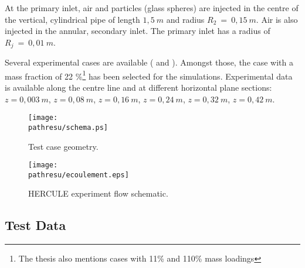 \documentclass[a4paper,twoside,12pt]{article}
\newlength{\largfigk}
\newcommand{\pathresu}{./FIGURES}
\begin{document}
\noindent
At the primary inlet, air and particles (glass spheres) are injected in the centre of the vertical, cylindrical pipe of length $1,5~m$ and radius $R_2~=~0,15~m$. Air is also injected in the annular, secondary inlet. The primary inlet has a radius of $R_j~=~0,01~m$.

\noindent
Several experimental cases are available (\cite{Rap3} and
\cite{TheseNC}). Amongst those, the case with a mass fraction of 22 \%\footnote{The thesis \cite{TheseNC} also mentions cases with 11\% and 110\% mass loadings} has been selected for the simulations. Experimental data is available along the centre line and at different horizontal plane sections: $z = 0,003~m$,
$z = 0,08~m$, $z = 0,16~m$, $z = 0,24~m$, $z = 0,32~m$, $z = 0,42~m$.


\begin{figure}[!htb]
   \centerline{\texttt{[image: \\pathresu/schema.ps]}}
   \caption{Test case geometry.}
   \label{schema}
\end{figure}

\begin{figure}[!htb]
   \centerline{\texttt{[image: \\pathresu/ecoulement.eps]}}
   \caption{HERCULE experiment flow schematic.}
   \label{ecoulement}
\end{figure}

\clearpage

\subsection{Test Data}
\end{document}

